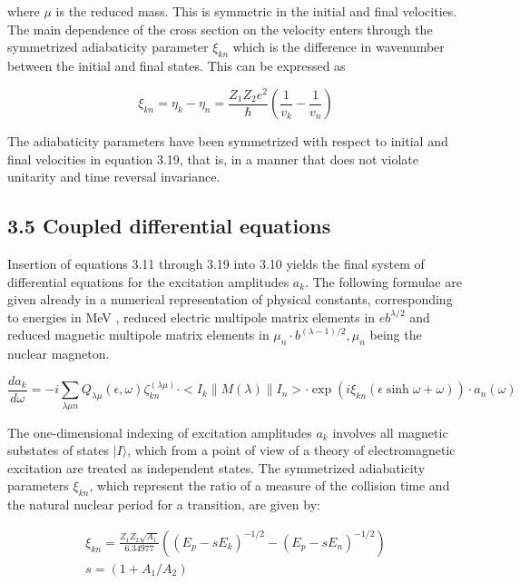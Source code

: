 \documentclass[10pt]{article}
\begin{document}
where $\mu$ is the reduced mass. This is symmetric in the initial and final velocities. The main dependence of the cross section on the velocity enters through the symmetrized adiabaticity parameter $\xi_{k n}$ which is the difference in wavenumber between the initial and final states. This can be expressed as


\begin{equation*}
\xi_{k n}=\eta_{k}-\eta_{n}=\frac{Z_{1} Z_{2} e^{2}}{\hbar}\left(\frac{1}{v_{k}}-\frac{1}{v_{n}}\right) \tag{3.19}
\end{equation*}


The adiabaticity parameters have been symmetrized with respect to initial and final velocities in equation 3.19, that is, in a manner that does not violate unitarity and time reversal invariance.

\subsection*{3.5 Coupled differential equations}
Insertion of equations 3.11 through 3.19 into 3.10 yields the final system of differential equations for the excitation amplitudes $a_{k}$. The following formulae are given already in a numerical representation of physical constants, corresponding to energies in MeV , reduced electric multipole matrix elements in $e b^{\lambda / 2}$ and reduced magnetic multipole matrix elements in $\mu_{n} \cdot b^{(\lambda-1) / 2}, \mu_{n}$ being the nuclear magneton.


\begin{equation*}
\frac{d a_{k}}{d \omega}=-i \sum_{\lambda \mu n} Q_{\lambda \mu}(\epsilon, \omega) \zeta_{k n}^{(\lambda \mu)} \cdot<I_{k}\|M(\lambda)\| I_{n}>\cdot \exp \left(i \xi_{k n}(\epsilon \sinh \omega+\omega)\right) \cdot a_{n}(\omega) \tag{3.20}
\end{equation*}


The one-dimensional indexing of excitation amplitudes $a_{k}$ involves all magnetic substates of states $|I\rangle$, which from a point of view of a theory of electromagnetic excitation are treated as independent states. The symmetrized adiabaticity parameters $\xi_{k n}$, which represent the ratio of a measure of the collision time and the natural nuclear period for a transition, are given by:


\begin{gather*}
\xi_{k n}=\frac{Z_{1} Z_{2} \sqrt{A_{1}}}{6.34977}\left(\left(E_{p}-s E_{k}\right)^{-1 / 2}-\left(E_{p}-s E_{n}\right)^{-1 / 2}\right)  \tag{3.21}\\
s=\left(1+A_{1} / A_{2}\right) \tag{3.22}
\end{gather*}
\end{document}
